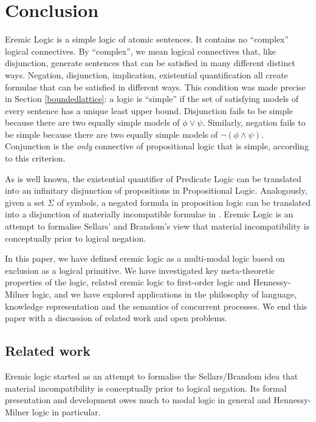 \section{Conclusion}\label{conclusion}

Eremic Logic is a simple logic of atomic sentences.
It contains no ``complex'' logical connectives.  
By ``complex'', we mean logical
connectives that, like disjunction, generate sentences that can be
satisfied in many different distinct ways.
Negation, disjunction,
implication, existential quantification all create formulae that can
be satisfied in different ways. 
This condition was
made precise in Section \ref{boundedlattice}: a logic is ``simple'' if the set of
satisfying models of every sentence has a unique least upper
bound. 
Disjunction fails to be simple because there are two equally
simple models of $\phi \lor \psi$. 
Similarly, negation fails to be simple
because there are two equally simple models of $\neg (\phi \land
\psi)$. 
Conjunction is the \emph{only} connective of propositional logic that is simple,
according to this criterion.

As is well known, the existential quantifier of Predicate Logic can be translated into an infinitary disjunction of propositions in Propositional Logic.
Analogously, given a set $\Sigma$ of symbols, a negated formula in proposition logic can be translated into a 
disjunction of materially incompatible formulae in \ELFULL{}.
Eremic Logic is an attempt to formalise Sellars' and Brandom's view that material incompatibility is conceptually prior to logical negation.

In this paper, we have defined eremic logic as a multi-modal logic based on
exclusion as a logical primitive. 
We have investigated key
meta-theoretic properties of the logic, related eremic logic to
first-order logic and Hennessy-Milner logic, and we have explored
applications in the philosophy of language, knowledge representation
and the semantics of concurrent processes. 
We end this paper with a
discussion of related work and open problems.

\subsection{Related work} 

Eremic logic started as an attempt to formalise the Sellars/Brandom idea that material incompatibility is conceptually prior to logical negation.
Its formal presentation and development
owes much to modal logic in general and Hennessy-Milner logic in
particular.


